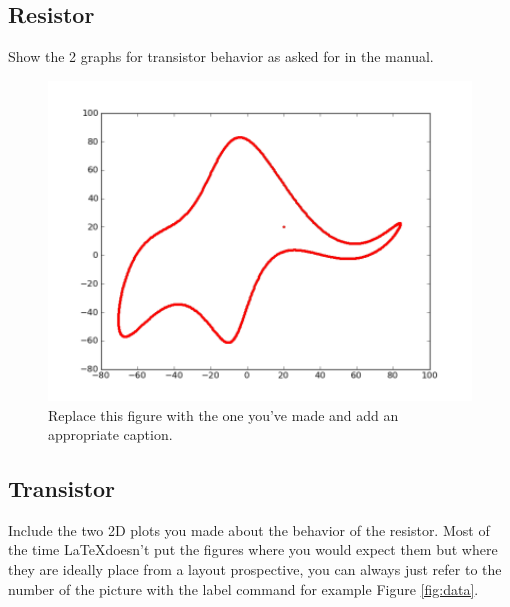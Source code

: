 \documentclass[a4paper]{article}
\begin{document}
\subsection{Resistor}


Show the 2 graphs for transistor behavior as asked for in the manual.

\begin{figure}
\centering
\includegraphics[width=1\textwidth]{elephant.png}
\caption{\label{fig:data1}Replace this figure \cite{elephant} with the one you've made and add an appropriate caption. }
\end{figure}

\subsection{Transistor}
Include the two 2D plots you made about the behavior of the resistor. Most of the time \LaTeX doesn't put the figures where you would expect them but where they are ideally place from a layout prospective, you can always just refer to the number of the picture with the label command for example Figure \ref{fig:data}.
\end{document}
